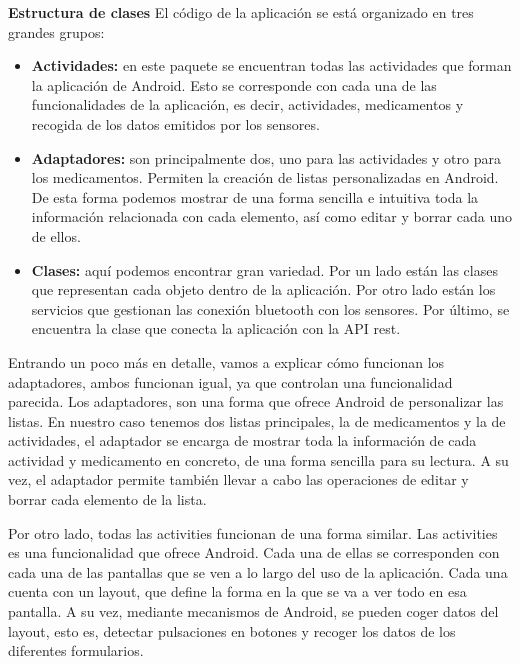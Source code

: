 \documentclass[11pt,spanish]{article}
\begin{document}
{\bf Estructura de clases}
\newline
\newline
El código de la aplicación se está organizado en tres grandes grupos:

\begin{itemize}
	\item {\bf Actividades: } en este paquete se encuentran todas las actividades que forman la aplicación de Android. Esto se corresponde con cada una de las funcionalidades de la aplicación, es decir, actividades, medicamentos y recogida de los datos emitidos por los sensores.
    \item {\bf Adaptadores: } son principalmente dos, uno para las actividades y otro para los medicamentos. Permiten la creación de listas personalizadas en Android. De esta forma podemos mostrar de una forma sencilla e intuitiva toda la información relacionada con cada elemento, así como editar y borrar cada uno de ellos.
    \item {\bf Clases: } aquí podemos encontrar gran variedad. Por un lado están las clases que representan cada objeto dentro de la aplicación. Por otro lado están los servicios que gestionan las conexión bluetooth con los sensores. Por último, se encuentra la clase que conecta la aplicación con la API rest.
\newline
\end{itemize}

Entrando un poco más en detalle, vamos a explicar cómo funcionan los adaptadores, ambos funcionan igual, ya que controlan una funcionalidad parecida. Los adaptadores, son una forma que ofrece Android de personalizar las listas. En nuestro caso tenemos dos listas principales, la de medicamentos y la de actividades, el adaptador se encarga de mostrar toda la información de cada actividad y medicamento en concreto, de una forma sencilla para su lectura. A su vez, el adaptador permite también llevar a cabo las operaciones de editar y borrar cada elemento de la lista.
\newline

Por otro lado, todas las activities funcionan de una forma similar. Las activities es una funcionalidad que ofrece Android. Cada una de ellas se corresponden con cada una de las pantallas que se ven a lo largo del uso de la aplicación. Cada una cuenta con un layout, que define la forma en la que se va a ver todo en esa pantalla. A su vez, mediante mecanismos de Android, se pueden coger datos del layout, esto es, detectar pulsaciones en botones y recoger los datos de los diferentes formularios.
\newpage
\end{document}
